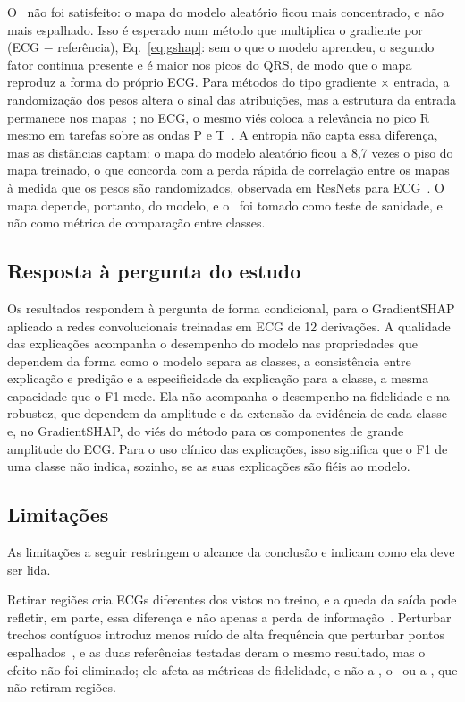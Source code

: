 O \EM\ não foi satisfeito: o mapa do modelo aleatório ficou mais concentrado, e não mais espalhado. Isso é esperado num método que multiplica o gradiente por (ECG $-$ referência), Eq.~\eqref{eq:gshap}: sem o que o modelo aprendeu, o segundo fator continua presente e é maior nos picos do QRS, de modo que o mapa reproduz a forma do próprio ECG. Para métodos do tipo gradiente × entrada, a randomização dos pesos altera o sinal das atribuições, mas a estrutura da entrada permanece nos mapas~\cite{adebayo2018}; no ECG, o mesmo viés coloca a relevância no pico R mesmo em tarefas sobre as ondas P e T~\cite{wagner2024}. A entropia não capta essa diferença, mas as distâncias captam: o mapa do modelo aleatório ficou a 8,7 vezes o piso do mapa treinado, o que concorda com a perda rápida de correlação entre os mapas à medida que os pesos são randomizados, observada em ResNets para ECG~\cite{arends2026}. O mapa depende, portanto, do modelo, e o \EM\ foi tomado como teste de sanidade, e não como métrica de comparação entre classes.

\subsection{Resposta à pergunta do estudo}
Os resultados respondem à pergunta de forma condicional, para o GradientSHAP aplicado a redes convolucionais treinadas em ECG de 12 derivações. A qualidade das explicações acompanha o desempenho do modelo nas propriedades que dependem da forma como o modelo separa as classes, a consistência entre explicação e predição e a especificidade da explicação para a classe, a mesma capacidade que o F1 mede. Ela não acompanha o desempenho na fidelidade e na robustez, que dependem da amplitude e da extensão da evidência de cada classe e, no GradientSHAP, do viés do método para os componentes de grande amplitude do ECG. Para o uso clínico das explicações, isso significa que o F1 de uma classe não indica, sozinho, se as suas explicações são fiéis ao modelo.

\subsection{Limitações}
As limitações a seguir restringem o alcance da conclusão e indicam como ela deve ser lida.

Retirar regiões cria ECGs diferentes dos vistos no treino, e a queda da saída pode refletir, em parte, essa diferença e não apenas a perda de informação~\cite{ismail2020}. Perturbar trechos contíguos introduz menos ruído de alta frequência que perturbar pontos espalhados~\cite{cui2023}, e as duas referências testadas deram o mesmo resultado, mas o efeito não foi eliminado; ele afeta as métricas de fidelidade, e não a \CS, o \RL\ ou a \CX, que não retiram regiões.

